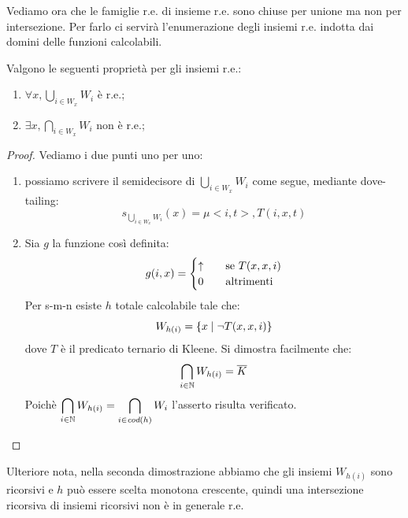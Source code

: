 Vediamo ora che le famiglie r.e. di insieme r.e. sono chiuse per unione ma non per intersezione. Per
farlo ci servirà l'enumerazione degli insiemi r.e. indotta dai domini delle funzioni calcolabili.
\begin{lem}
    Valgono le seguenti proprietà per gli insiemi r.e.:
    \begin{enumerate}
        \item $\forall x, \displaystyle\bigcup_{i \in W_{x}}W_{i}$ è r.e.;
        \item $\exists x, \displaystyle\bigcap_{i \in W_{x}}W_{i}$ non è r.e.;
    \end{enumerate}
\end{lem}
\begin{proof}
    Vediamo i due punti uno per uno:
    \begin{enumerate}
        \item possiamo scrivere il semidecisore di $\displaystyle\bigcup_{i \in W_{x}}W_{i}$ come
        segue, mediante dove-tailing:
        \begin{equation*}
            s_{\bigcup_{i \in W_{x}}W_{i}}(x) = \mu <i,t>, T(i,x,t)
        \end{equation*}
        \item 
        Sia $g$ la funzione così definita:
        \begin{equation*}
            g(i,x) =
            \begin{cases}
                \uparrow \quad &\text{se $T(x,x,i)$} \\
                0 \quad &\text{altrimenti} \\
            \end{cases}
        \end{equation*}
        Per s-m-n esiste $h$ totale calcolabile tale che:
        \begin{equation*}
            W_{h(i)} = \{x \mid \lnot T(x,x,i)\}
        \end{equation*}
        dove $T$ è il predicato ternario di Kleene. Si dimostra facilmente che:
        \begin{equation*}
            \bigcap_{i \in \mathbb{N}}W_{h(i)} = \overline{K}
        \end{equation*}
        Poichè $\displaystyle\bigcap_{i \in \mathbb{N}}W_{h(i)} = \displaystyle\bigcap_{i \in
        \textit{cod}(h)}W_{i}$ l'asserto risulta verificato.
    \end{enumerate}
\end{proof}

Ulteriore nota, nella seconda dimostrazione abbiamo che gli insiemi $W_{h(i)}$ sono ricorsivi e $h$
può essere scelta monotona crescente, quindi una intersezione ricorsiva di insiemi ricorsivi non è
in generale r.e.
